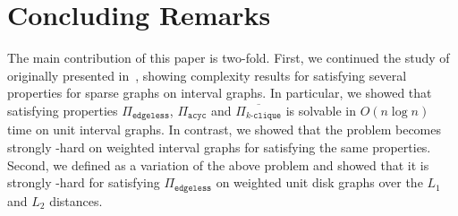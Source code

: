 \section{Concluding Remarks}\label{sec:conclu}

The main contribution of this paper is two-fold.
First, we continued the study of {\gged} originally presented in~\cite{HonoratoDroguett2024}, showing complexity results for satisfying several properties for sparse graphs on interval graphs.
In particular, we showed that satisfying properties $\Pi_{\texttt{edgeless}}$, $\Pi_{\texttt{acyc}}$ and $\overline{\Pi_{k\texttt{-clique}}}$ is solvable in $O(n\log n)$ time on unit interval graphs.
In contrast, we showed that the problem becomes strongly \NP-hard on weighted interval graphs for satisfying the same properties.
Second, we defined {\ggedmm} as a variation of the above problem and showed that it is strongly {\NP-hard} for satisfying $\Pi_{\texttt{edgeless}}$ on weighted unit disk graphs over the $L_1$ and $L_2$ distances.
%

